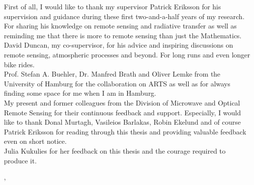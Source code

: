 

First of all, I would like to thank my supervisor Patrick Eriksson for his
supervision and guidance during these first two-and-a-half years of my research.
For sharing his knowledge on remote sensing and radiative transfer as well as
reminding me that there is more to remote sensing than just the Mathematics.
\\[0.1cm]
 
David Duncan, my co-supervisor, for his advice and inspiring discussions on
remote sensing, atmospheric processes and beyond. For long runs and even longer
bike rides.\\[0.1cm]

Prof. Stefan A. Buehler, Dr. Manfred Brath and Oliver Lemke from the University
of Hamburg for the collaboration on ARTS as well as for always finding some
space for me when I am in Hamburg.\\[0.1cm]

My present and former colleagues from the Division of Microwave and Optical
Remote Sensing for their continuous feedback and support. Especially, I would
like to thank Donal Murtagh, Vasileios Barlakas, Robin Ekelund and of course
Patrick Eriksson for reading through this thesis and providing valuable feedback
even on short notice.\\[0.1cm]

Julia Kukulies for her feedback on this thesis and the courage required to
produce it.


\vskip 2pc

\noindent \thesisauthor

\noindent \thesiscity, \thesismonth\ \thesisyear  %

